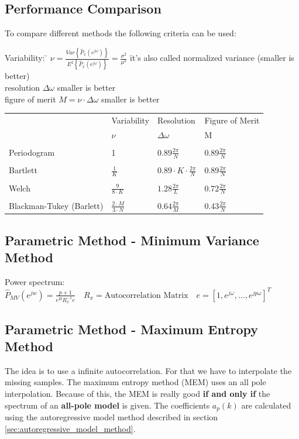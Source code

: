 \subsection{Performance Comparison }
To compare different methods the following criteria can be used:\\
\begin{tabbing}
Variability:   \hspace{1cm}  	\=
  $\nu=\frac{Var\left\lbrace\hat{P}_{x}(e^{j\omega})\right\rbrace}{E^2\left\lbrace\hat{P}_{x}(e^{j\omega})\right\rbrace}=\frac{\sigma^2}{\mu^2}$
  \hspace{1cm} \= it's also called normalized variance (smaller is better)\\
  resolution \> $\Delta \omega$ \> smaller is better\\
  figure of merit					\> $M=\nu\cdot \Delta\omega$ \> smaller is better\\
\end{tabbing}
\begin{tabular}{p{3cm} | p{2cm} p{2.5cm} p{3cm}}
& Variability & Resolution & Figure of Merit\\
& $\nu$	&	$\Delta\omega$	& M \\
\hline\\
Periodogram & 1 & $0.89 \frac{2\pi}{N}$ & $0.89 \frac{2\pi}{N}$\\\\
Bartlett & $\frac{1}{K}$ & $0.89\cdot K \cdot  \frac{2\pi}{N}$ & $0.89 \frac{2\pi}{N}$\\\\
Welch & $\frac{9}{8\cdot K}$ & $1.28 \frac{2\pi}{L}$ & $0.72 \frac{2\pi}{N}$\\\\
Blackman-Tukey (Barlett)& $\frac{2\cdot M}{3\cdot N}$  & $0.64 \frac{2\pi}{M}$ & $0.43 \frac{2\pi}{N}$
\end{tabular}

\subsection{Parametric Method - Minimum Variance Method }
Power spectrum: $\hat{P}_{MV}(e^{jw}) = \frac{p+1}{e^H R_x^{-1}e} \quad R_x = \text{Autocorrelation Matrix} \quad e=[1,e^{j\omega},\ldots, e^{jp\omega}]^T$

\subsection{Parametric Method - Maximum Entropy Method }
The idea is to use a infinite autocorrelation. For that we have to interpolate the missing samples.
The maximum entropy method (MEM) uses an all pole interpolation.
Because of this, the MEM is really good \textbf{if and only if} the spectrum of an \textbf{all-pole model} is given.
The coefficients $a_p(k)$ are calculated using the autoregressive model method described in section \ref{sec:autoregressive_model_method}.

